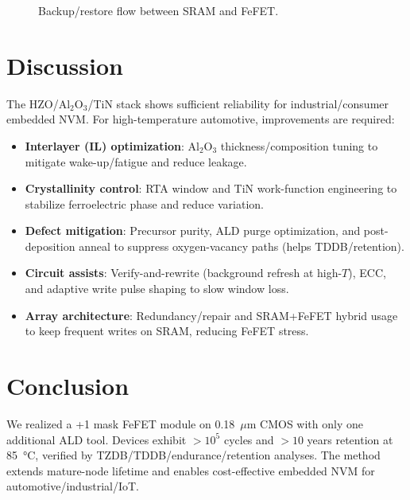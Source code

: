 \documentclass[conference]{IEEEtran}
\begin{document}
\begin{figure}[!b]
  \centering
  \vspace{-2pt}
  \caption{Backup/restore flow between SRAM and FeFET.}
  \label{fig:backup_flow}
  \vspace{-2mm}
\end{figure}

\section{Discussion}
The HZO/Al$_2$O$_3$/TiN stack shows sufficient reliability for industrial/consumer embedded NVM.
For high-temperature automotive, improvements are required:
\begin{itemize}
  \item \textbf{Interlayer (IL) optimization}: Al$_2$O$_3$ thickness/composition tuning to mitigate wake-up/fatigue and reduce leakage.
  \item \textbf{Crystallinity control}: RTA window and TiN work-function engineering to stabilize ferroelectric phase and reduce variation.
  \item \textbf{Defect mitigation}: Precursor purity, ALD purge optimization, and post-deposition anneal to suppress oxygen-vacancy paths (helps TDDB/retention).
  \item \textbf{Circuit assists}: Verify-and-rewrite (background refresh at high-$T$), ECC, and adaptive write pulse shaping to slow window loss.
  \item \textbf{Array architecture}: Redundancy/repair and SRAM+FeFET hybrid usage to keep frequent writes on SRAM, reducing FeFET stress.
\end{itemize}

\section{Conclusion}
We realized a +1 mask FeFET module on 0.18~$\mu$m CMOS with only one additional ALD tool.
Devices exhibit $>10^5$ cycles and $>10$ years retention at \SI{85}{\celsius}, verified by TZDB/TDDB/endurance/retention analyses.
The method extends mature-node lifetime and enables cost-effective embedded NVM for automotive/industrial/IoT.
\end{document}
